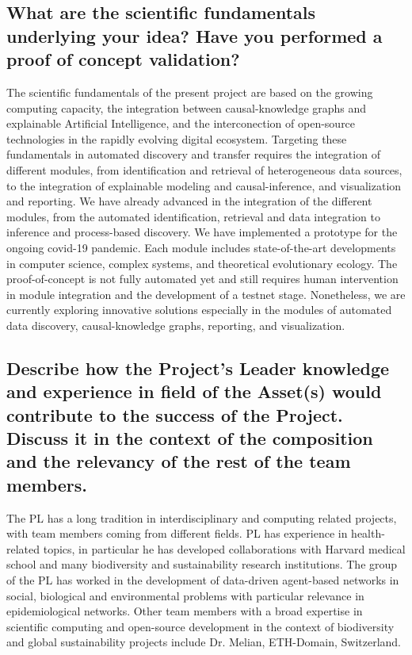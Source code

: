 \documentclass[authoryear,1p,12pt]{elsarticle}
\begin{document}
\subsection{{\bf What are the scientific fundamentals underlying your
    idea? Have you performed a proof of concept validation?}}
The scientific fundamentals of the present project are based on the
growing computing capacity, the integration between causal-knowledge
graphs and explainable Artificial Intelligence, and the interconection
of open-source technologies in the rapidly evolving digital
ecosystem. Targeting these fundamentals in automated discovery and
transfer requires the integration of different modules, from
identification and retrieval of heterogeneous data sources, to the
integration of explainable modeling and causal-inference, and
visualization and reporting. We have already advanced in the
integration of the different modules, from the automated
identification, retrieval and data integration to inference and
process-based discovery. We have implemented a prototype for the
ongoing covid-19 pandemic. Each module includes state-of-the-art
developments in computer science, complex systems, and theoretical
evolutionary ecology. The proof-of-concept is not fully automated yet
and still requires human intervention in module integration and the
development of a testnet stage. Nonetheless, we are currently
exploring innovative solutions especially in the modules of automated
data discovery, causal-knowledge graphs, reporting, and visualization.

\subsection{{\bf Describe how the Project’s Leader knowledge and
    experience in field of the Asset(s) would contribute to the
    success of the Project. Discuss it in the context of the
    composition and the relevancy of the rest of the team
    members.}}

The PL has a long tradition in interdisciplinary and computing related
projects, with team members coming from different fields. PL has
experience in health-related topics, in particular he has developed
collaborations with Harvard medical school and many biodiversity and
sustainability research institutions. The group of the PL has worked
in the development of data-driven agent-based networks in social,
biological and environmental problems with particular relevance in
epidemiological networks. Other team members with a broad expertise in
scientific computing and open-source development in the context of
biodiversity and global sustainability projects include Dr. Melian,
ETH-Domain, Switzerland.
\end{document}
